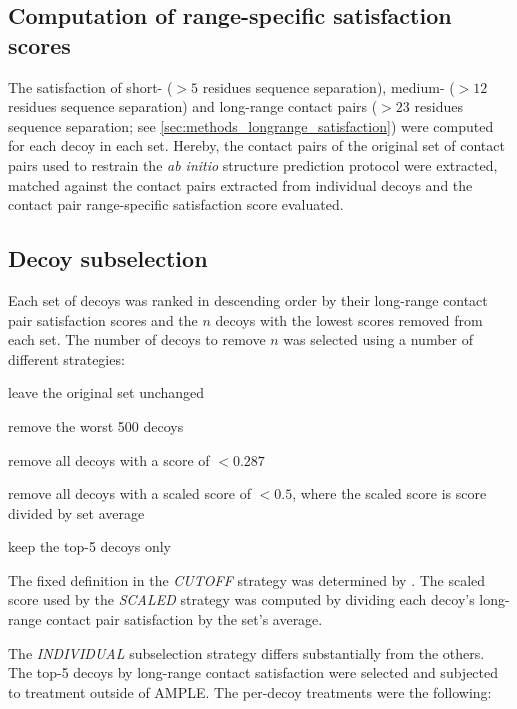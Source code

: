 \subsection{Computation of range-specific satisfaction scores}
The satisfaction of short- ($>5$ residues sequence separation), medium- ($>12$ residues sequence separation) and long-range contact pairs ($>23$ residues sequence separation; see \cref{sec:methods_longrange_satisfaction}) were computed for each decoy in each set. Hereby, the contact pairs of the original set of contact pairs used to restrain the \textit{ab initio} structure prediction protocol were extracted, matched against the contact pairs extracted from individual decoys and the contact pair range-specific satisfaction score evaluated. 

\subsection{Decoy subselection} \label{sec:ample_decoys_decoy_selection}
Each set of decoys was ranked in descending order by their long-range contact pair satisfaction scores and the $n$ decoys with the lowest scores removed from each set. The number of decoys to remove $n$ was selected using a number of different strategies:

\begin{description}[style=multiline,leftmargin=4cm]
    \item[\textit{NONE}] leave the original set unchanged
    \item[\textit{LINEAR}] remove the worst 500 decoys
    \item[\textit{CUTOFF}] remove all decoys with a score of $<0.287$ 
    \item[\textit{SCALED}] remove all decoys with a scaled score of $<0.5$, where the scaled score is score divided by set average
    \item[\textit{INDIVIDUAL}] keep the top-5 decoys only
\end{description}

The fixed definition in the \textit{CUTOFF} strategy was determined by \textcite{De_Oliveira2017-gj}. The scaled score used by the \textit{SCALED} strategy was computed by dividing each decoy's long-range contact pair satisfaction by the set's average.

The \textit{INDIVIDUAL} subselection strategy differs substantially from the others. The top-5 decoys by long-range contact satisfaction were selected and subjected to treatment outside of AMPLE. The per-decoy treatments were the following:

